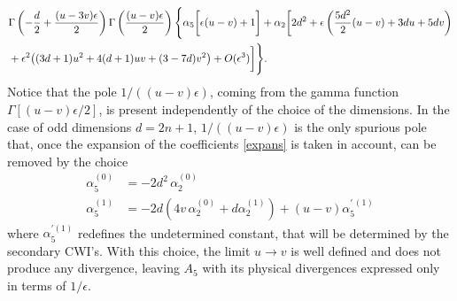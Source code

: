 \documentclass[a4paper,11pt,openright,twoside]{book}
\let\a=\alpha   \let\b=\beta   \let\g=\gamma   \let\d=\delta
\let\e=\epsilon \let\z=\zeta   \let\h=\eta     \let\q=\theta
\numberwithin{equation}{section}
\begin{document}
{{{\begin{align}
	&\Gamma\left(-\frac{d}{2}+\frac{(u-3v)\e}{2}\right)\Gamma\left(\frac{(u-v)\e}{2}\right)\Bigg\{\a_5\bigg[\e(u-v)+1\bigg]+\a_2\bigg[2d^2+\e\left(\frac{5d^2}{2}(u-v)+3du+5dv\right)
	\notag\\
	&+\e^2\big((3d+1)u^2+4(d+1)uv+(3-7d)v^2\big)+O(\e^3)\bigg]\Bigg\}.
\end{align}
Notice that the pole $1/((u-v)\e)$, coming from the gamma function $\Gamma[(u-v)\e/2]$, is present independently of the choice of the dimensions. In the case of odd dimensions $d=2n+1$, $1/((u-v)\e)$ is the only spurious pole that, once the expansion of the coefficients \eqref{expans} is taken in account, can be removed by the choice
\begin{equation}
	\begin{split}
		\a_5^{(0)}&=-2d^2\,\a_2^{(0)}\\
		\a_5^{(1)}&=-2d\left(4v\,\a_2^{(0)}+d\a_2^{(1)}\right)+(u-v)\a_5^{\prime\,(1)}
	\end{split}\label{redef1}
\end{equation}
where $\a_5^{\prime(1)}$ redefines the undetermined constant,  that will be determined by the secondary CWI's. With this choice, the limit $u\to v$ is well defined and does not produce any divergence, leaving $A_5$ with its physical divergences expressed only in terms of $1/\e$.

}}}
\end{document}
